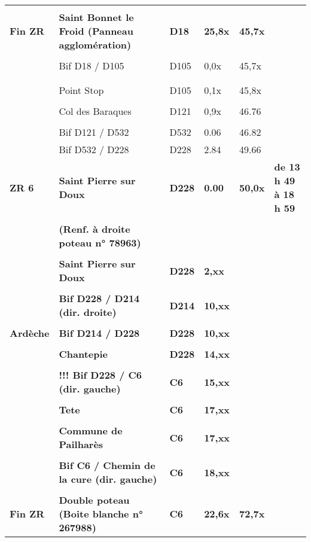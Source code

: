 \documentclass{article}%
\begin{document}
\begin{longtable}{p{2.25cm}|p{6.7cm}|p{2.0cm}|p{1.5cm}|p{1.5cm}|p{3.5cm}}
 & & & & & \\%
\textbf{Fin ZR }&\textbf{Saint Bonnet le Froid (Panneau agglomération) }&\textbf{D18 }&\textbf{25,8x}&\textbf{45,7x}& \\%
 & & & & & \\%
 &Bif D18 / D105&D105&0,0x&45,7x& \\%
 & & & & & \\%
\hline& & & & & \\%
 &Point Stop &D105 &0,1x&45,8x& \\%
 & & & & & \\%
 &Col des Baraques&D121&0,9x&46.76& \\%
 & & & & & \\%
 &Bif D121 / D532&D532&0.06&46.82& \\%
 &Bif D532 / D228&D228&2.84&49.66& \\%
\textbf{ZR 6}&\textbf{Saint Pierre sur Doux  }&\textbf{D228}&\textbf{0.00}&\textbf{50,0x}&\textbf{de 13 h 49 à 18 h 59}\\%
 & & & & & \\%
\textbf{  }&\textbf{(Renf. à droite poteau n° 78963) }& & & & \\%
 & & & & & \\%
 &\textbf{Saint Pierre sur Doux}&\textbf{D228}&\textbf{2,xx}& & \\%
 & & & & & \\%
 &\textbf{Bif D228 / D214 (dir. droite)}&\textbf{D214 }&\textbf{10,xx}& & \\%
 & & & & & \\%
\textbf{Ardèche}&\textbf{Bif D214 / D228}&\textbf{D228}&\textbf{10,xx}& & \\%
 & & & & & \\%
 &\textbf{Chantepie}&\textbf{D228}&\textbf{14,xx}& & \\%
 & & & & & \\%
 &\textbf{!!! Bif D228 / C6 (dir. gauche)}&\textbf{C6}&\textbf{15,xx}& & \\%
 & & & & & \\%
 &\textbf{Tete}&\textbf{C6}&\textbf{17,xx}& & \\%
 & & & & & \\%
 &\textbf{Commune de Pailharès}&\textbf{C6 }&\textbf{17,xx}& & \\%
 & & & & & \\%
 &\textbf{Bif C6 / Chemin de la cure (dir. gauche)}&\textbf{C6}&\textbf{18,xx}& & \\%
 & & & & & \\%
\textbf{Fin ZR }&\textbf{Double poteau (Boite blanche n° 267988)}&\textbf{C6}&\textbf{22,6x}&\textbf{72,7x}& \\%

\end{longtable}
\end{document}
